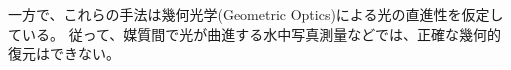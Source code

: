 
    
    

一方で、これらの手法は幾何光学(Geometric Optics)による光の直進性を仮定している。
従って、媒質間で光が曲進する水中写真測量などでは、正確な幾何的復元はできない。

